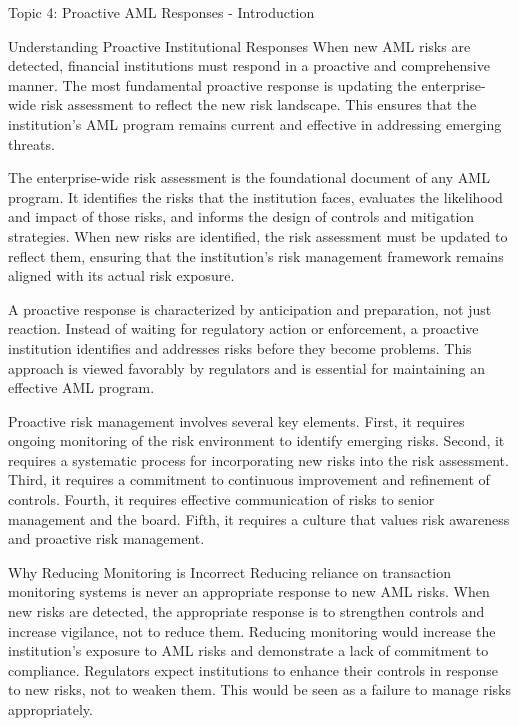 \documentclass[8pt]{beamer}  %
\begin{document}
	\begin{frame}{Topic 4: Proactive AML Responses - Introduction}
		\begin{block}{\large Understanding Proactive Institutional Responses}
			When new AML risks are detected, financial institutions must respond in a proactive and comprehensive manner. The most fundamental proactive response is updating the enterprise-wide risk assessment to reflect the new risk landscape. This ensures that the institution's AML program remains current and effective in addressing emerging threats.
			
			The enterprise-wide risk assessment is the foundational document of any AML program. It identifies the risks that the institution faces, evaluates the likelihood and impact of those risks, and informs the design of controls and mitigation strategies. When new risks are identified, the risk assessment must be updated to reflect them, ensuring that the institution's risk management framework remains aligned with its actual risk exposure.
			
			A proactive response is characterized by anticipation and preparation, not just reaction. Instead of waiting for regulatory action or enforcement, a proactive institution identifies and addresses risks before they become problems. This approach is viewed favorably by regulators and is essential for maintaining an effective AML program.
			
			Proactive risk management involves several key elements. First, it requires ongoing monitoring of the risk environment to identify emerging risks. Second, it requires a systematic process for incorporating new risks into the risk assessment. Third, it requires a commitment to continuous improvement and refinement of controls. Fourth, it requires effective communication of risks to senior management and the board. Fifth, it requires a culture that values risk awareness and proactive risk management.
		\end{block}
		
		\vspace{0.2cm}
		\begin{block}{\large Why Reducing Monitoring is Incorrect}
			Reducing reliance on transaction monitoring systems is never an appropriate response to new AML risks. When new risks are detected, the appropriate response is to strengthen controls and increase vigilance, not to reduce them. Reducing monitoring would increase the institution's exposure to AML risks and demonstrate a lack of commitment to compliance. Regulators expect institutions to enhance their controls in response to new risks, not to weaken them. This would be seen as a failure to manage risks appropriately.
		\end{block}
	\end{frame}
	
\end{document}
